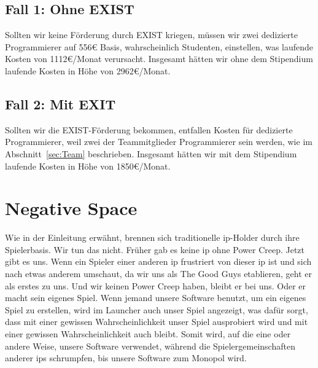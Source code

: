 \documentclass[fontsize=11, a4aper]{scrartcl}
\begin{document}
\subsection{Fall 1: Ohne EXIST} \label{subsec:Fall_1_:_Ohne_EXISI}

Sollten wir keine Förderung durch EXIST kriegen, müssen wir zwei dedizierte Programmierer auf 556€ Basis, wahrscheinlich Studenten, einstellen, was laufende Kosten von 1112€/Monat verursacht. Insgesamt hätten wir ohne dem Stipendium laufende Kosten in Höhe von 2962€/Monat.

\subsection{Fall 2: Mit EXIT} \label{subsec:Fall_2_:_Mit_EXIST}

Sollten wir die EXIST-Förderung bekommen, entfallen Kosten für dedizierte Programmierer, weil zwei der Teammitglieder Programmierer sein werden, wie im Abschnitt~\ref{sec:Team} beschrieben. Insgesamt hätten wir mit dem Stipendium laufende Kosten in Höhe von 1850€/Monat.

\section{Negative Space} \label{sec:Negativ_Space}

Wie in der Einleitung erwähnt, brennen sich traditionelle \ac{ip}-Holder durch ihre Spielerbasis. Wir tun das nicht. Früher gab es keine \ac{ip} ohne Power Creep. Jetzt gibt es uns. Wenn ein Spieler einer anderen \ac{ip} frustriert von dieser \ac{ip} ist und sich nach etwas anderem umschaut, da wir uns als \glqq The Good Guys\grqq{} etablieren, geht er als erstes zu uns. Und wir keinen Power Creep haben, bleibt er bei uns. Oder er macht sein eigenes Spiel. Wenn jemand unsere Software benutzt, um ein eigenes Spiel zu erstellen, wird im Launcher auch unser Spiel angezeigt, was dafür sorgt, dass mit einer gewissen Wahrscheinlichkeit unser Spiel ausprobiert wird und mit einer gewissen Wahrscheinlichkeit auch bleibt. Somit wird, auf die eine oder andere Weise, unsere Software verwendet, während die Spielergemeinschaften anderer \acp{ip} schrumpfen, bis unsere Software zum Monopol wird.



\end{document}
